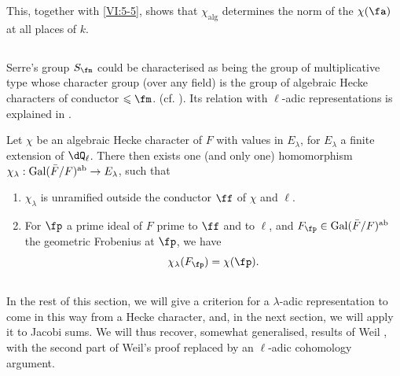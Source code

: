 This, together with \ref{VI:5-5}, shows that $\chi_\text{alg}$ determines the norm
of the $\chi(\fa)$ at all places of $k$. 





\subsection{}\label{VI:5-7}

Serre's group $S_\fm$ could be characterised as being the
group of multiplicative type whose character group (over any
field) is the group of algebraic Hecke characters of conductor
$\leqslant \fm$. (cf. \cite[II 2.1 et 2.2]{se68}). Its relation with
$\ell$-adic representations is explained in \cite[II 2.3]{se68}. 





\begin{theorem_}[{\cite{se68}}]\label{VI:5-8}
Let $\chi$ be an algebraic Hecke character of $F$ with values in $E_\lambda$, for
$E_\lambda$ a finite extension of $\dQ_\ell$. There then exists one (and only one)
homomorphism $\chi_\lambda:\operatorname{Gal}(\bar F/F)^\textnormal{ab} \to E_\lambda$, such
that
\begin{enumerate}[\indent (i)]
  \item $\chi_\lambda$ is unramified outside the conductor $\ff$ of
    $\chi$ and $\ell$.
  \item For $\fp$ a prime ideal of $F$ prime to $\ff$ and to $\ell$,
    and $F_\fp\in \gal(\bar F/F)^\textnormal{ab}$ the geometric Frobenius
    at $\fp$, we have 
    \[
      \chi_\lambda(F_\fp) = \chi(\fp) \text{.}
    \] 
\end{enumerate}
\end{theorem_}





\subsection{}\label{VI:5-9}

In the rest of this section, we will give a criterion for a
$\lambda$-adic representation to come in this way from a Hecke character,
and, in the next section, we will apply it to Jacobi sums. We
will thus recover, somewhat generalised, results of Weil
\cite{we52,we74-2}, with the second part of Weil's proof
replaced by an $\ell$-adic cohomology argument. 





